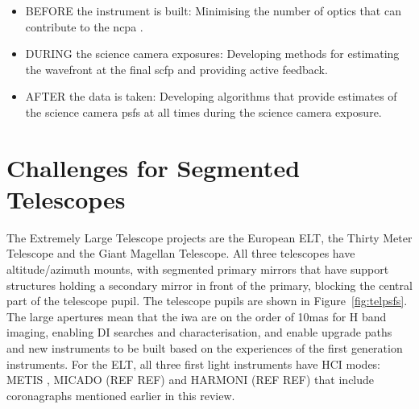 \documentclass[letterpaper]{ar-1col}
\begin{document}
\begin{itemize}
    \item BEFORE the instrument is built: Minimising the number of optics that can contribute to the \ac{ncpa} \citep[by making the optics optomechanically and thermally stable; ][]{Absil24}.
    \item DURING the science camera exposures: Developing methods for estimating the wavefront at the final \ac{scfp} and providing active feedback.
    
    \item AFTER the data is taken: Developing algorithms that provide estimates of the science camera \acp{psf} at all times during the science camera exposure.
\end{itemize}









\section{Challenges for Segmented Telescopes}

The Extremely Large Telescope projects are the European ELT, the Thirty Meter Telescope and the Giant Magellan Telescope.
%
All three telescopes have altitude/azimuth mounts, with segmented primary mirrors that have support structures holding a secondary mirror in front of the primary, blocking the central part of the telescope pupil.
%
The telescope pupils are shown in Figure~\ref{fig:telpsfs}.
%
The large apertures mean that the \ac{iwa} are on the order of 10mas for H band imaging, enabling DI searches and characterisation, and enable upgrade paths and new instruments to be built based on the experiences of the first generation instruments.
%
For the ELT, all three first light instruments have HCI modes: METIS \citep{Brandl21,Kenworthy16,Carlomagno20}, MICADO (REF REF) and HARMONI (REF REF) that include coronagraphs mentioned earlier in this review.
%
\end{document}
